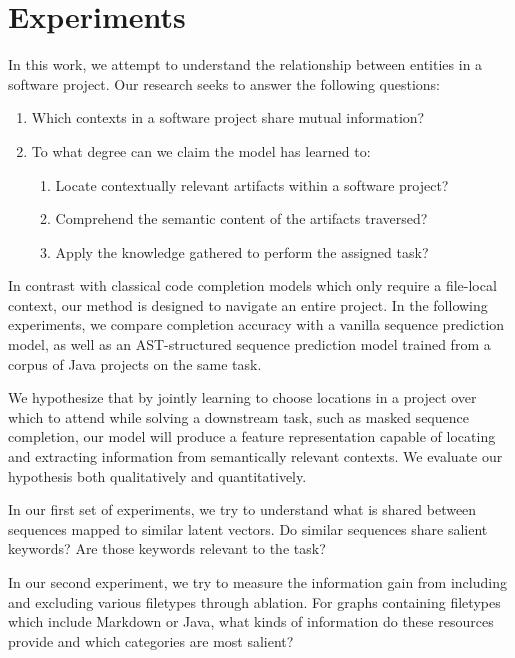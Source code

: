 \documentclass[11pt]{article}
\begin{document}
\section{Experiments}

In this work, we attempt to understand the relationship between entities in a software project. Our research seeks to answer the following questions:

\begin{enumerate}
  \item Which contexts in a software project share mutual information?
  \item To what degree can we claim the model has learned to:\begin{enumerate}
  \item Locate contextually relevant artifacts within a software project?
  \item Comprehend the semantic content of the artifacts traversed?
  \item Apply the knowledge gathered to perform the assigned task?
  \end{enumerate}
\end{enumerate}

In contrast with classical code completion models which only require a file-local context, our method is designed to navigate an entire project. In the following experiments, we compare completion accuracy with a vanilla sequence prediction model, as well as an AST-structured sequence prediction model trained from a corpus of Java projects on the same task.

We hypothesize that by jointly learning to choose locations in a project over which to attend while solving a downstream task, such as masked sequence completion, our model will produce a feature representation capable of locating and extracting information from semantically relevant contexts. We evaluate our hypothesis both qualitatively and quantitatively.

In our first set of experiments, we try to understand what is shared between sequences mapped to similar latent vectors. Do similar sequences share salient keywords? Are those keywords relevant to the task?

In our second experiment, we try to measure the information gain from including and excluding various filetypes through ablation. For graphs containing filetypes which include Markdown or Java, what kinds of information do these resources provide and which categories are most salient?
\end{document}
